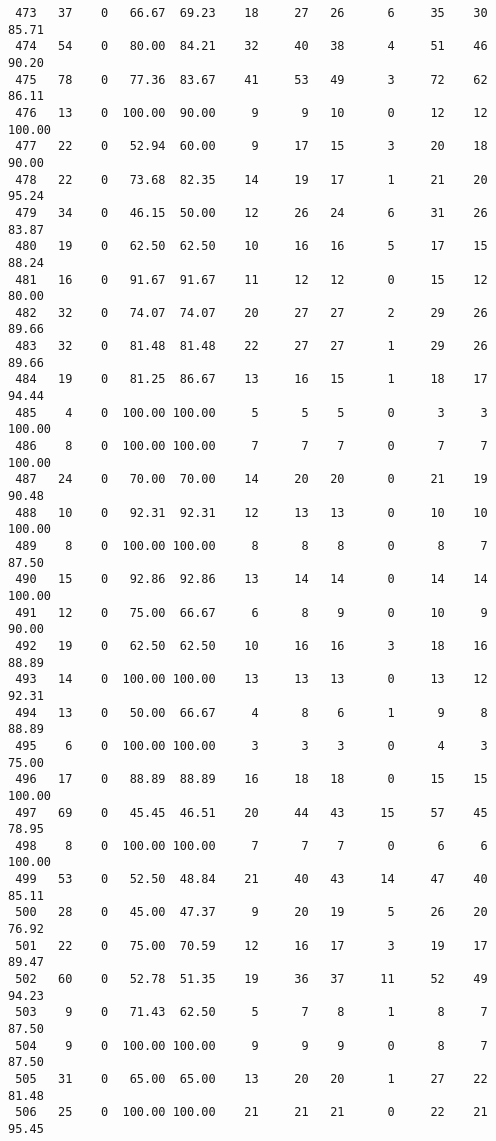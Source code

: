 \begin{verbatim}
 473   37    0   66.67  69.23    18     27   26      6     35    30    85.71
 474   54    0   80.00  84.21    32     40   38      4     51    46    90.20
 475   78    0   77.36  83.67    41     53   49      3     72    62    86.11
 476   13    0  100.00  90.00     9      9   10      0     12    12   100.00
 477   22    0   52.94  60.00     9     17   15      3     20    18    90.00
 478   22    0   73.68  82.35    14     19   17      1     21    20    95.24
 479   34    0   46.15  50.00    12     26   24      6     31    26    83.87
 480   19    0   62.50  62.50    10     16   16      5     17    15    88.24
 481   16    0   91.67  91.67    11     12   12      0     15    12    80.00
 482   32    0   74.07  74.07    20     27   27      2     29    26    89.66
 483   32    0   81.48  81.48    22     27   27      1     29    26    89.66
 484   19    0   81.25  86.67    13     16   15      1     18    17    94.44
 485    4    0  100.00 100.00     5      5    5      0      3     3   100.00
 486    8    0  100.00 100.00     7      7    7      0      7     7   100.00
 487   24    0   70.00  70.00    14     20   20      0     21    19    90.48
 488   10    0   92.31  92.31    12     13   13      0     10    10   100.00
 489    8    0  100.00 100.00     8      8    8      0      8     7    87.50
 490   15    0   92.86  92.86    13     14   14      0     14    14   100.00
 491   12    0   75.00  66.67     6      8    9      0     10     9    90.00
 492   19    0   62.50  62.50    10     16   16      3     18    16    88.89
 493   14    0  100.00 100.00    13     13   13      0     13    12    92.31
 494   13    0   50.00  66.67     4      8    6      1      9     8    88.89
 495    6    0  100.00 100.00     3      3    3      0      4     3    75.00
 496   17    0   88.89  88.89    16     18   18      0     15    15   100.00
 497   69    0   45.45  46.51    20     44   43     15     57    45    78.95
 498    8    0  100.00 100.00     7      7    7      0      6     6   100.00
 499   53    0   52.50  48.84    21     40   43     14     47    40    85.11
 500   28    0   45.00  47.37     9     20   19      5     26    20    76.92
 501   22    0   75.00  70.59    12     16   17      3     19    17    89.47
 502   60    0   52.78  51.35    19     36   37     11     52    49    94.23
 503    9    0   71.43  62.50     5      7    8      1      8     7    87.50
 504    9    0  100.00 100.00     9      9    9      0      8     7    87.50
 505   31    0   65.00  65.00    13     20   20      1     27    22    81.48
 506   25    0  100.00 100.00    21     21   21      0     22    21    95.45

\end{verbatim}
